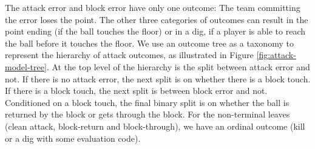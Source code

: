 \documentclass{article}
\begin{document}
The attack error and block error have only one outcome: The team committing the error loses the point. The other three categories of outcomes can result in the point ending (if the ball touches the floor) or in a dig, if a player is able to reach the ball before it touches the floor. We use an outcome tree as a taxonomy to represent the hierarchy of attack outcomes, as illustrated in Figure \ref{fig:attack-model-tree}. At the top level of the hierarchy is the split between attack error and not. If there is no attack error, the next split is on whether there is a block touch. If there is a block touch, the next split is between block error and not. Conditioned on a block touch, the final binary split is on whether the ball is returned by the block or gets through the block. For the non-terminal leaves (clean attack, block-return and block-through), we have an ordinal outcome (kill or a dig with some evaluation code).
\end{document}
